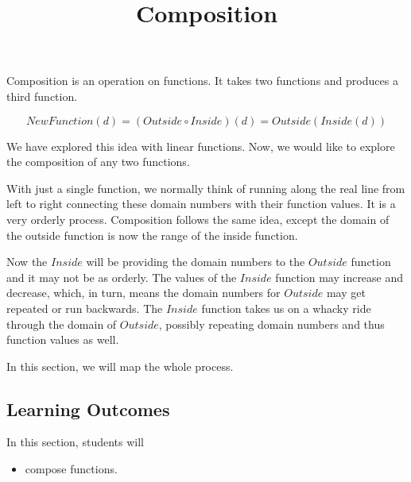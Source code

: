 \documentclass{ximera}
\title{Composition}
\begin{document}
\begin{abstract}
\end{abstract}
\maketitle













Composition is an operation on functions.  It takes two functions and produces a third function.


\[  NewFunction(d) = (Outside \circ Inside)(d) = Outside(Inside(d))    \]



We have explored this idea with linear functions.  Now, we would like to explore the composition of any two functions.






With just a single function, we normally think of running along the real line from left to right connecting these domain numbers with their function values.  It is a very orderly process.  Composition follows the same idea, except the domain of the outside function is now the range of the inside function.

Now the $Inside$ will be providing the domain numbers to the $Outside$ function and it may not be as orderly. The values of the $Inside$ function may increase and decrease, which, in turn, means the domain numbers for $Outside$ may get repeated or run backwards.   The $Inside$ function takes us on a whacky ride through the domain of $Outside$, possibly repeating domain numbers and thus function values as well.


In this section, we will map the whole process.










\subsection*{Learning Outcomes}





\begin{sectionOutcomes}
In this section, students will 

\begin{itemize}
\item compose functions.
\end{itemize}
\end{sectionOutcomes}
\end{document}
